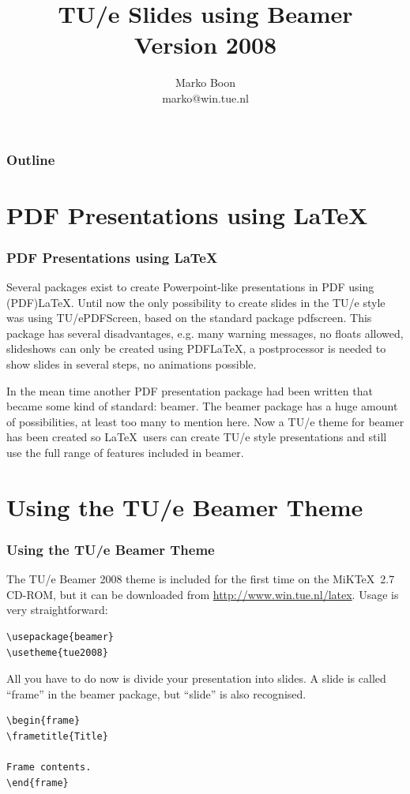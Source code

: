 \documentclass[t]{beamer}
\title{TU/e Slides using Beamer\\\Large Version 2008}
\author{Marko Boon\\ marko@win.tue.nl}
\begin{document}
\begin{titleframe}
\end{titleframe}

\begin{frame}
  \frametitle{Outline}
  \tableofcontents[pausesections]
\end{frame}

\section{PDF Presentations using \LaTeX}
\begin{frame}
\frametitle{PDF Presentations using \LaTeX}
Several packages exist to create Powerpoint-like presentations in PDF using (PDF)\LaTeX. Until now the only possibility to create slides in the
TU/e style was using TU/ePDFScreen, based on the standard package \textsf{pdfscreen}. This package has several disadvantages, e.g. many warning messages, no floats allowed, slideshows can only be created using PDF\LaTeX, a postprocessor is needed to show slides in several steps, no animations possible.

In the mean time another PDF presentation package had been written that became some kind of standard: {\sf beamer}. The beamer package has a huge amount of possibilities, at least too many to mention here. Now a TU/e theme for beamer has been created so \LaTeX\ users can create TU/e style presentations and still use the full range of features included in {\sf beamer}.
\end{frame}

\section{Using the TU/e Beamer Theme}
\begin{slidetop}
\frametitle{Using the TU/e Beamer Theme}

The TU/e Beamer 2008 theme is included for the first time on the MiK\TeX\ 2.7 CD-ROM, but it can be downloaded from \href{http://www.win.tue.nl/latex}{http://www.win.tue.nl/latex}. Usage is very straightforward:

\begin{lstlisting}
\usepackage{beamer}
\usetheme{tue2008}
\end{lstlisting}

All you have to do now is divide your presentation into slides. A slide is called ``frame'' in the {\sf beamer} package, but ``slide'' is also recognised.

\begin{lstlisting}
\begin{frame}
\frametitle{Title}

Frame contents.
\end{frame}
\end{lstlisting}
\end{slidetop}
\end{document}
